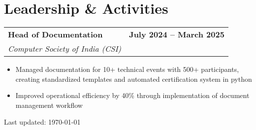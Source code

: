 \documentclass[10pt,a4paper]{article}
\makeatletter
\newcommand{\resumeItem}[1]{\item\small{#1}}
\newcommand{\resumeSubheading}[4]{
  \vspace{-1pt}
  \begin{tabular*}{\textwidth}[t]{l@{\extracolsep{\fill}}r}
    \textbf{#1} & \textcolor{light}{\small\textbf{#2}} \\
    \textit{\small#3} & \textcolor{light}{\small#4} \\
  \end{tabular*}\vspace{-5pt}
}
\makeatother
\begin{document}
\vspace{0.1em}

\section{Leadership \& Activities}

\resumeSubheading
{Head of Documentation}{July 2024 -- March 2025}
{Computer Society of India (CSI)}{}
\begin{itemize}
    \resumeItem{Managed documentation for 10+ technical events with 500+ participants, creating standardized templates and automated certification system in python}
    \resumeItem{Improved operational efficiency by 40\% through implementation of document management workflow}
   
\end{itemize}

\vfill
\begin{center}
    \textcolor{light}{\footnotesize Last updated: \today}
\end{center}
\end{document}
